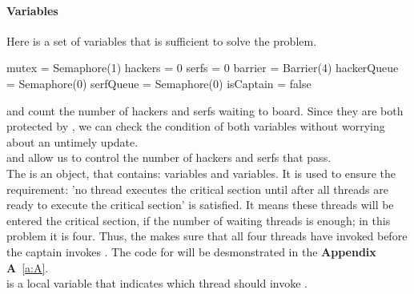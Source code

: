 \documentclass[a4paper, 10pt]{article}
\begin{document}
\paragraph{Variables} Here is a set of variables that is sufficient to solve the problem. 
\begin{mycodeblock}
mutex = Semaphore(1)
hackers = 0
serfs = 0
barrier = Barrier(4)
hackerQueue = Semaphore(0)
serfQueue = Semaphore(0)
isCaptain = false
\end{mycodeblock}
 \hspace*{1em} {} and {} count the number of hackers and serfs waiting to board. Since they are both protected by {}, we can check the condition of both variables without worrying about an untimely update.\\ 
\hspace*{1em} {} and {} allow us to control the number of hackers and serfs that pass.\\ \hspace*{1em} The {} is an object, that contains: {} variables and {} variables. It is used to ensure the requirement: 'no thread executes the critical section until after all threads are ready to execute the critical section' is satisfied. It means these threads will be entered the critical section, if the number of waiting threads is enough; in this problem it is four. Thus, the {} makes sure that all four threads have invoked {} before the captain invokes {}. The code for {} will be desmonstrated in the \textbf{Appendix A}~\ref{a:A}.\\
\hspace*{1em} {} is a local variable that indicates which thread should invoke {}.
\end{document}

